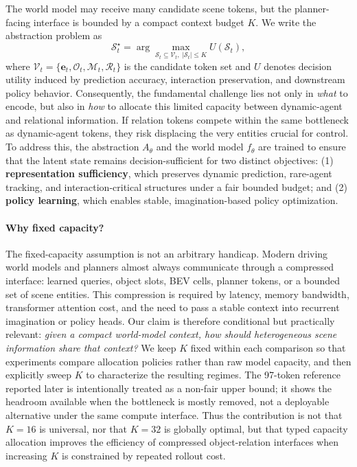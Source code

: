 \documentclass[10pt,journal,compsoc]{IEEEtran}
\begin{document}
The world model may receive many candidate scene tokens, but the planner-facing interface is bounded by a compact context budget $K$. We write the abstraction problem as
\begin{equation}
\mathcal{S}^{\star}_t
= \arg\max_{\mathcal{S}_t \subseteq \mathcal{V}_t,\ |\mathcal{S}_t|\le K}
U(\mathcal{S}_t),
\label{eq:bounded_abstraction}
\end{equation}
where $\mathcal{V}_t=\{\mathbf{e}_t,\mathcal{O}_t,\mathcal{M}_t,\mathcal{R}_t\}$ is the candidate token set and $U$ denotes decision utility induced by prediction accuracy, interaction preservation, and downstream policy behavior. Consequently, the fundamental challenge lies not only in \emph{what} to encode, but also in \emph{how} to allocate this limited capacity between dynamic-agent and relational information. If relation tokens compete within the same bottleneck as dynamic-agent tokens, they risk displacing the very entities crucial for control. To address this, the abstraction $A_\theta$ and the world model $f_\theta$ are trained to ensure that the latent state remains decision-sufficient for two distinct objectives: (1) \textbf{representation sufficiency}, which preserves dynamic prediction, rare-agent tracking, and interaction-critical structures under a fair bounded budget; and (2) \textbf{policy learning}, which enables stable, imagination-based policy optimization.

\paragraph{Why fixed capacity?}
The fixed-capacity assumption is not an arbitrary handicap. Modern driving world models and planners almost always communicate through a compressed interface: learned queries, object slots, BEV cells, planner tokens, or a bounded set of scene entities. This compression is required by latency, memory bandwidth, transformer attention cost, and the need to pass a stable context into recurrent imagination or policy heads. Our claim is therefore conditional but practically relevant: \emph{given a compact world-model context, how should heterogeneous scene information share that context?} We keep $K$ fixed within each comparison so that experiments compare allocation policies rather than raw model capacity, and then explicitly sweep $K$ to characterize the resulting regimes. The 97-token reference reported later is intentionally treated as a non-fair upper bound; it shows the headroom available when the bottleneck is mostly removed, not a deployable alternative under the same compute interface. Thus the contribution is not that $K=16$ is universal, nor that $K=32$ is globally optimal, but that typed capacity allocation improves the efficiency of compressed object-relation interfaces when increasing $K$ is constrained by repeated rollout cost.
\end{document}
